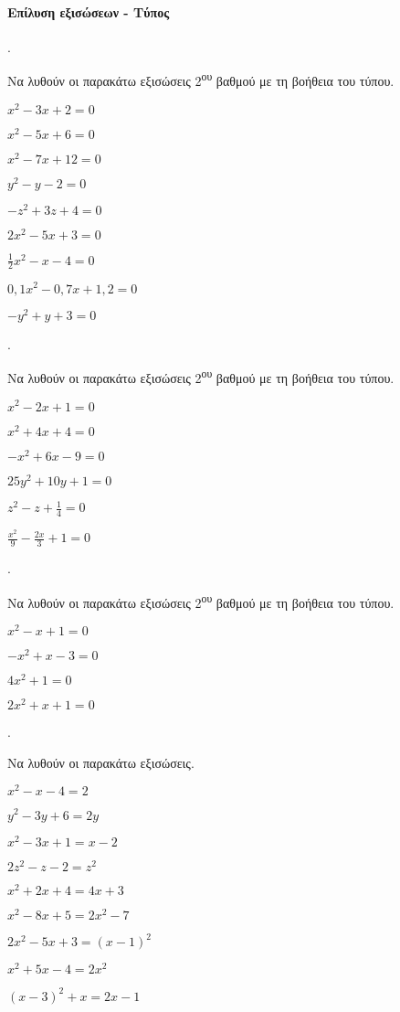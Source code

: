 \documentclass[11pt,a4paper,twocolumn]{article}
\newcounter{askhsh}
\newcommand{\askhsh}{\large\theaskhsh.\ \addtocounter{askhsh}{1}}
\begin{document}
\paragraph{Επίλυση εξισώσεων - Τύπος}
\askhsh Να λυθούν οι παρακάτω εξισώσεις 2\textsuperscript{ου} βαθμού με τη βοήθεια του τύπου.
\begin{multicols}{2}
\begin{alist}[leftmargin=5mm]
\item $ x^2-3x+2=0 $
\item $ x^2-5x+6=0 $
\item $ x^2-7x+12=0 $
\item $ y^2-y-2=0 $
\item $ -z^2+3z+4=0 $
\item $ 2x^2-5x+3=0 $
\item $ \frac{1}{2}x^2-x-4=0 $
\item {\small $ 0{,}1x^2-0{,}7x+1{,}2=0 $}
\item $ -y^2+y+3=0 $
\end{alist}
\end{multicols}
\askhsh Να λυθούν οι παρακάτω εξισώσεις 2\textsuperscript{ου} βαθμού με τη βοήθεια του τύπου.
\begin{multicols}{2}
\begin{alist}
\item $ x^2-2x+1=0 $
\item $ x^2+4x+4=0 $
\item $ -x^2+6x-9=0 $
\item $ 25y^2+10y+1=0 $
\item $ z^2-z+\frac{1}{4}=0 $
\item $ \frac{x^2}{9}-\frac{2x}{3}+1=0 $
\end{alist}
\end{multicols}
\askhsh Να λυθούν οι παρακάτω εξισώσεις 2\textsuperscript{ου} βαθμού με τη βοήθεια του τύπου.
\begin{multicols}{2}
\begin{alist}
\item $ x^2-x+1=0 $
\item $ -x^2+x-3=0 $
\item $ 4x^2+1=0 $
\item $2x^2+x+1=0$
\end{alist}
\end{multicols}
\askhsh Να λυθούν οι παρακάτω εξισώσεις.
\begin{alist}
\item $ x^2-x-4=2 $
\item $ y^2-3y+6=2y $
\item $ x^2-3x+1=x-2 $
\item $ 2z^2-z-2=z^2 $
\item $ x^2+2x+4=4x+3 $
\item $ x^2-8x+5=2x^2-7 $
\item $ 2x^2-5x+3=(x-1)^2 $
\item $ x^2+5x-4=2x^2 $
\item $ (x-3)^2+x=2x-1 $
\end{alist}
\end{document}
